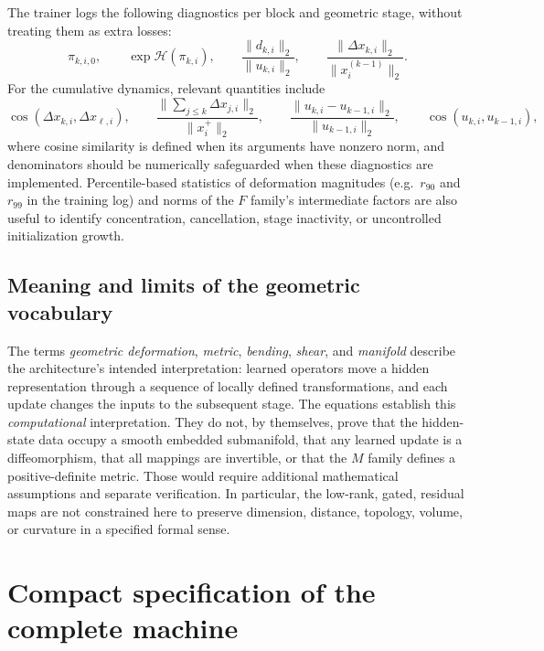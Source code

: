 \documentclass[11pt,a4paper]{article}
\begin{document}
The trainer logs the following diagnostics per block and geometric stage, without
treating them as extra losses:
\begin{equation}
\pi_{k,i,0},\qquad \exp\mathcal H(\pi_{k,i}),\qquad \frac{\|d_{k,i}\|_2}{\|u_{k,i}\|_2},\qquad
\frac{\|\Delta x_{k,i}\|_2}{\|x_i^{(k-1)}\|_2}.
\end{equation}
For the cumulative dynamics, relevant quantities include
\begin{equation}
\cos(\Delta x_{k,i},\Delta x_{\ell,i}),\qquad \frac{\bigl\|\sum_{j\le k}\Delta x_{j,i}\bigr\|_2}{\|x_i^{+}\|_2},\qquad
\frac{\|u_{k,i}-u_{k-1,i}\|_2}{\|u_{k-1,i}\|_2},\qquad \cos(u_{k,i},u_{k-1,i}),
\end{equation}
where cosine similarity is defined when its arguments have nonzero norm, and denominators should be
numerically safeguarded when these diagnostics are implemented. Percentile-based statistics of
deformation magnitudes (e.g.\ $r_{90}$ and $r_{99}$ in the training log) and norms of the $F$ family's
intermediate factors are also useful to identify concentration, cancellation, stage inactivity, or
uncontrolled initialization growth.

\subsection{Meaning and limits of the geometric vocabulary}

The terms \emph{geometric deformation}, \emph{metric}, \emph{bending}, \emph{shear}, and \emph{manifold}
describe the architecture's intended interpretation: learned operators move a hidden representation
through a sequence of locally defined transformations, and each update changes the inputs to the
subsequent stage. The equations establish this \emph{computational} interpretation. They do not, by
themselves, prove that the hidden-state data occupy a smooth embedded submanifold, that any learned update
is a diffeomorphism, that all mappings are invertible, or that the $M$ family defines a positive-definite
metric. Those would require additional mathematical assumptions and separate verification. In particular,
the low-rank, gated, residual maps are not constrained here to preserve dimension, distance, topology,
volume, or curvature in a specified formal sense.

\section{Compact specification of the complete machine}
\end{document}
